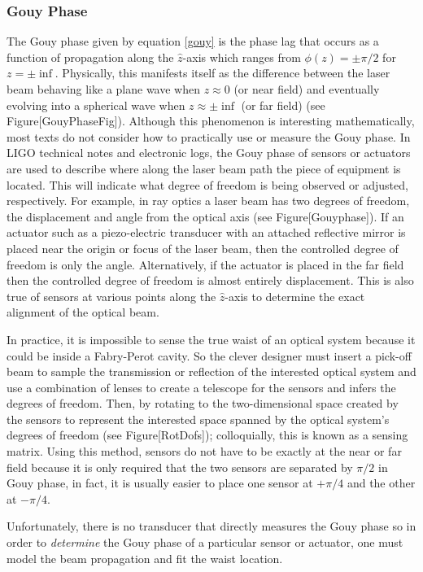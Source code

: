 		\subsubsection{Gouy Phase}
		The Gouy phase given by equation \ref{gouy} is the phase lag that occurs as a function of propagation along the $\hat{z}$-axis which ranges from $\phi(z) = \pm \pi/2$ for $z =\pm \inf$.  Physically, this manifests itself as the difference between the laser beam behaving like a plane wave when $z\approx0$ (or near field) and eventually evolving into a spherical wave when $z\approx \pm \inf$ (or far field) (see Figure[GouyPhaseFig]).  Although this phenomenon is interesting mathematically, most texts do not consider how to practically use or measure the Gouy phase.  In LIGO technical notes and electronic logs, the Gouy phase of sensors or actuators are used to describe where along the laser beam path the piece of equipment is located.  This will indicate what degree of freedom is being observed or adjusted, respectively.  For example, in ray optics \cite{Saleh} a laser beam has two degrees of freedom, the displacement and angle from the optical axis (see Figure[Gouyphase]).  If an actuator such as a piezo-electric transducer with an attached reflective mirror is placed near the origin or focus of the laser beam, then the controlled degree of freedom is only the angle.  Alternatively, if the actuator is placed in the far field then the controlled degree of freedom is almost entirely displacement.  This is also true of sensors at various points along the $\hat{z}$-axis to determine the exact alignment of the optical beam.
		
		In practice, it is impossible to sense the true waist of an optical system because it could be inside a Fabry-Perot cavity.  So the clever designer must insert a pick-off beam to sample the transmission or reflection of the interested optical system and use a combination of lenses to create a telescope for the sensors and infers the degrees of freedom.  Then, by rotating to the two-dimensional space created by the sensors to represent the interested space spanned by the optical system's degrees of freedom (see Figure[RotDofs]); colloquially, this is known as a sensing matrix.  Using this method, sensors do not have to be exactly at the near or far field because it is only required that the two sensors are separated by $\pi/2$ in Gouy phase, in fact, it is usually easier to place one sensor at $+\pi/4$ and the other at $-\pi/4$. 
		
		Unfortunately, there is no transducer that directly measures the Gouy phase so in order to \textit{determine} the Gouy phase of a particular sensor or actuator, one must model the beam propagation and fit the waist location.
		
